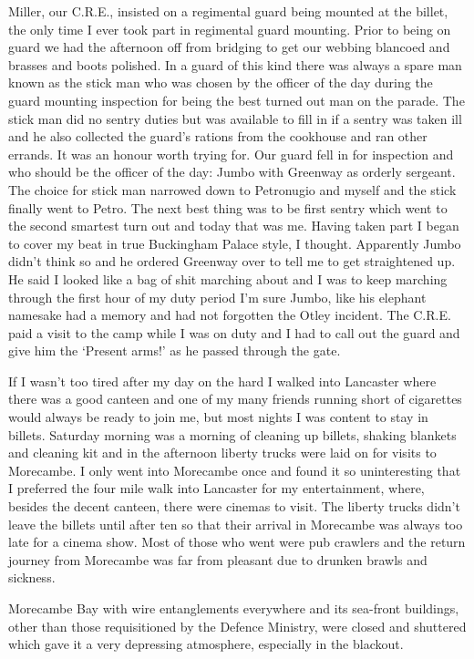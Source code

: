 \LColonel Miller, our C.R.E., insisted on a regimental guard being
mounted at the billet, the only time I ever took part in regimental
guard mounting. Prior to being on guard we had the afternoon off from
bridging to get our webbing blancoed and brasses and boots
polished. In a guard of this kind there was always a spare man known
as the stick man who was chosen by the officer of the day during the
guard mounting inspection for being the best turned out man on the
parade. The stick man did no sentry duties but was available to fill
in if a sentry was taken ill and he also collected the guard's rations
from the cookhouse and ran other errands. It was an honour worth
trying for. Our guard fell in for inspection and who should be the
officer of the day: Jumbo with \sergeant Greenway as orderly
sergeant. The choice for stick man narrowed down to \sapper Petronugio
and myself and the stick finally went to Petro. The next best thing
was to be first sentry which went to the second smartest turn out and
today that was me. Having taken part I began to cover my beat in true
Buckingham Palace style, I thought. Apparently Jumbo didn't think so
and he ordered \sergeant Greenway over to tell me to get straightened
up. He said I looked like a bag of shit marching about and I was to
keep marching through the first hour of my duty period I'm sure Jumbo,
like his elephant namesake had a memory and had not forgotten the
Otley incident. The C.R.E. paid a visit to the camp while I was on
duty and I had to call out the guard and give him the `Present arms!'
as he passed through the gate.

If I wasn't too tired after my day on the hard I walked into Lancaster
where there was a good canteen and one of my many friends running
short of cigarettes would always be ready to join me, but most nights I
was content to stay in billets. Saturday morning was a morning of
cleaning up billets, shaking blankets and cleaning kit and in the
afternoon liberty trucks were laid on for visits to Morecambe. I only
went into Morecambe once and found it so uninteresting that I
preferred the four mile walk into Lancaster for my entertainment,
where, besides the decent canteen, there were cinemas to visit. The
liberty trucks didn't leave the billets until after ten so that their
arrival in Morecambe was always too late for a cinema show. Most of
those who went were pub crawlers and the return journey from Morecambe
was far from pleasant due to drunken brawls and sickness.

Morecambe Bay with wire entanglements everywhere and its sea-front
buildings, other than those requisitioned by the Defence Ministry,
were closed and shuttered which gave it a very depressing atmosphere,
especially in the blackout.

